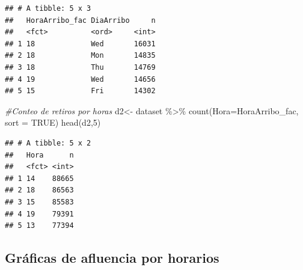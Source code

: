 \documentclass[
]{article}
\newenvironment{Shaded}{\begin{snugshade}}{\end{snugshade}}
\newcommand{\AttributeTok}[1]{\textcolor[rgb]{0.77,0.63,0.00}{#1}}
\newcommand{\CommentTok}[1]{\textcolor[rgb]{0.56,0.35,0.01}{\textit{#1}}}
\newcommand{\ConstantTok}[1]{\textcolor[rgb]{0.00,0.00,0.00}{#1}}
\newcommand{\DecValTok}[1]{\textcolor[rgb]{0.00,0.00,0.81}{#1}}
\newcommand{\FunctionTok}[1]{\textcolor[rgb]{0.00,0.00,0.00}{#1}}
\newcommand{\NormalTok}[1]{#1}
\newcommand{\OtherTok}[1]{\textcolor[rgb]{0.56,0.35,0.01}{#1}}
\newcommand{\SpecialCharTok}[1]{\textcolor[rgb]{0.00,0.00,0.00}{#1}}
\newcommand{\StringTok}[1]{\textcolor[rgb]{0.31,0.60,0.02}{#1}}
\begin{document}
\begin{verbatim}
## # A tibble: 5 x 3
##   HoraArribo_fac DiaArribo     n
##   <fct>          <ord>     <int>
## 1 18             Wed       16031
## 2 18             Mon       14835
## 3 18             Thu       14769
## 4 19             Wed       14656
## 5 15             Fri       14302
\end{verbatim}

\begin{Shaded}
\begin{Highlighting}[]
\CommentTok{\#Conteo de retiros por horas}
\NormalTok{d2}\OtherTok{\textless{}{-}}\NormalTok{ dataset }\SpecialCharTok{\%\textgreater{}\%} \FunctionTok{count}\NormalTok{(}\AttributeTok{Hora=}\NormalTok{HoraArribo\_fac, }\AttributeTok{sort =} \ConstantTok{TRUE}\NormalTok{)}
\FunctionTok{head}\NormalTok{(d2,}\DecValTok{5}\NormalTok{)}
\end{Highlighting}
\end{Shaded}

\begin{verbatim}
## # A tibble: 5 x 2
##   Hora      n
##   <fct> <int>
## 1 14    88665
## 2 18    86563
## 3 15    85583
## 4 19    79391
## 5 13    77394
\end{verbatim}

\begin{Shaded}
\end{Shaded}

\hypertarget{gruxe1ficas-de-afluencia-por-horarios}{%
\subsection{Gráficas de afluencia por
horarios}\label{gruxe1ficas-de-afluencia-por-horarios}}
\end{document}
